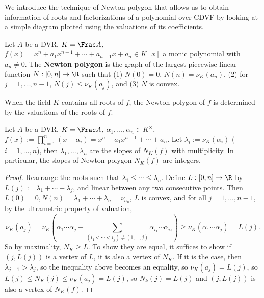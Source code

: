 \documentclass[11pt]{amsart}
\begin{document}
\medskip

We introduce the technique of Newton polygon that allows us to obtain
information of roots and factorizations of a polynomial over CDVF by looking at
a simple diagram plotted using the valuations of its coefficients.

\begin{defn}
    Let $A$ be a DVR, $K = \Frac A$, $f(x) = x^n + a_1 x^{n-1} + \cdots +
    a_{n-1}x + a_n \in K[x]$ a monic polynomial with $a_n \neq 0$.  The {\bf
        Newton polygon}  is the graph of the largest
    piecewise linear function $N : [0, n] \to \R$ such that (1) $N(0) = 0$,
    $N(n) = \nu_K(a_n)$, (2) for $j = 1, \ldots, n-1$, $N(j) \leq \nu_K(a_j)$,
    and (3) $N$ is convex.
\end{defn}

When the field $K$ contains all roots of $f$, the Newton polygon of $f$ is
determined by the valuations of the roots of $f$.

\begin{lem}
    \label{lem:newton-polygon-split}
    Let $A$ be a DVR, $K = \Frac A$, $\alpha_1, \ldots, \alpha_n \in
    K^{\times}$, $f(x) := \prod_{i = 1}^{n} (x - \alpha_i) = x^n + a_1 x^{n-1} +
    \cdots + a_n$.  Let $\lambda_i := \nu_K(\alpha_i)$ ($i = 1, \ldots, n$),
    then $\lambda_1, \ldots, \lambda_n$ are the slopes of $N_K(f)$ with
    multiplicity.  In particular, the slopes of Newton polygon $N_K(f)$ are integers.
\end{lem}

\begin{proof}
    Rearrange the roots such that $\lambda_1 \leq \cdots \leq \lambda_n$.
    Define $L : [0, n] \to \R$ by $L(j) := \lambda_1 + \cdots + \lambda_j$, and
    linear between any two consecutive points.  Then $L(0) = 0, N(n) = \lambda_1
    + \cdots + \lambda_n = \nu_{a_n}$, $L$ is convex, and for all $j = 1,
    \ldots, n-1$, by the ultrametric property of valuation,
    \[
        \nu_K(a_j) = \nu_K(\alpha_1 \cdots \alpha_j + \sum_{(i_1 < \cdots < i_j)
        \neq (1, \ldots, j)} \alpha_{i_1} \cdots \alpha_{i_j})
        \geq \nu_K(\alpha_1 \cdots \alpha_j) = L(j).
    \]
    So by maximality, $N_K \geq L$.  To show they are equal, it suffices to show
    if $(j, L(j))$ is a vertex of $L$, it is also a vertex of $N_K$.  If it is
    the case, then $\lambda_{j+1} > \lambda_j$, so the inequality above becomes
    an equality, so $\nu_K(a_j) = L(j)$, so $L(j) \leq N_K(j) \leq \nu_K(a_j) =
    L(j)$, so $N_k(j) = L(j)$ and $(j, L(j))$ is also a vertex of $N_K(f)$.
\end{proof}
\end{document}
